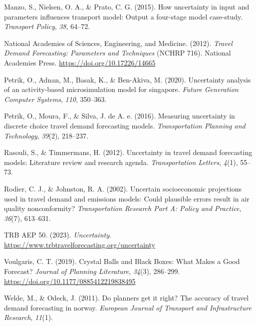 \documentclass[fancy, masters, twoside]{byuthesis}
\newlength{\cslhangindent}
\newlength{\cslentryspacingunit} %
\newenvironment{CSLReferences}[2] %
 {%
  \setlength{\parindent}{0pt}
  \ifodd #1
  \let\oldpar\par
  \def\par{\hangindent=\cslhangindent\oldpar}
  \fi
  \setlength{\parskip}{#2\cslentryspacingunit}
 }%
 {}
\begin{document}
\begin{CSLReferences}{1}{0}
\leavevmode{}%
Manzo, S., Nielsen, O. A., \& Prato, C. G. (2015). How uncertainty in input and parameters influences transport model: Output a four-stage model case-study. \emph{Transport Policy}, \emph{38}, 64--72.

\leavevmode{}%
National Academies of Sciences, Engineering, and Medicine. (2012). \emph{Travel {Demand Forecasting}: {Parameters} and {Techniques}} (NCHRP 716). {National Academies Press}. \url{https://doi.org/10.17226/14665}

\leavevmode{}%
Petrik, O., Adnan, M., Basak, K., \& Ben-Akiva, M. (2020). Uncertainty analysis of an activity-based microsimulation model for singapore. \emph{Future Generation Computer Systems}, \emph{110}, 350--363.

\leavevmode{}%
Petrik, O., Moura, F., \& Silva, J. de A. e. (2016). Measuring uncertainty in discrete choice travel demand forecasting models. \emph{Transportation Planning and Technology}, \emph{39}(2), 218--237.

\leavevmode{}%
Rasouli, S., \& Timmermans, H. (2012). Uncertainty in travel demand forecasting models: Literature review and research agenda. \emph{Transportation Letters}, \emph{4}(1), 55--73.

\leavevmode{}%
Rodier, C. J., \& Johnston, R. A. (2002). Uncertain socioeconomic projections used in travel demand and emissions models: Could plausible errors result in air quality nonconformity? \emph{Transportation Research Part A: Policy and Practice}, \emph{36}(7), 613--631.

\leavevmode{}%
TRB AEP 50. (2023). \emph{Uncertainty}. \url{https://www.trbtravelforecasting.org/uncertainty}

\leavevmode{}%
Voulgaris, C. T. (2019). Crystal {Balls} and {Black Boxes}: {What Makes} a {Good Forecast}? \emph{Journal of Planning Literature}, \emph{34}(3), 286--299. \url{https://doi.org/10.1177/0885412219838495}

\leavevmode{}%
Welde, M., \& Odeck, J. (2011). Do planners get it right? The accuracy of travel demand forecasting in norway. \emph{European Journal of Transport and Infrastructure Research}, \emph{11}(1).


\end{CSLReferences}
\end{document}
